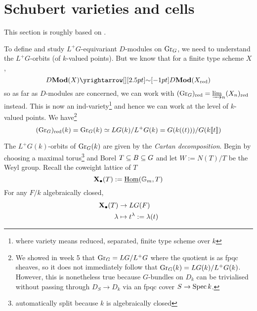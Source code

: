 \documentclass{article}
\begin{document}


\section{Schubert varieties and cells}

This section is roughly based on \cite[Section 2.1]{Zhu-17}.

To define and study $L^+G$-equivariant $D$-modules on $\operatorname{Gr}_G$,
we need to understand the $L^+G$-orbits (of $k$-valued points).
But we know that for a finite type scheme $X$, 
\[
  D\MOD(X) \map{\sim}{} D\MOD(X_\RED)
\]
so as far as $D$-modules are concerned,
we can work with $(\operatorname{Gr}_G)_{\mathrm{red}} = \varinjlim_{n} (X_n)_{\mathrm{red}}$ instead.
This is now an ind-variety\footnote{
  where variety means reduced, separated, finite type scheme over $k$
}
and hence we can work at the level of $k$-valued points.
We have\footnote{
  We showed in week 5 that $\operatorname{Gr}_G = LG / L^+G$ where the quotient
  is as fpqc sheaves, so it does not
  immediately follow that $\operatorname{Gr}_G(k) = LG(k) / L^+G(k)$.
  However, this is nonetheless true because $G$-bundles on $D_k$
  can be trivialised without passing through $D_S \to D_k$ 
  via an fpqc cover $S \to \operatorname{Spec} k$.
}
\[
  (\operatorname{Gr}_G)_{\mathrm{red}}(k) = \operatorname{Gr}_G(k) \simeq LG(k) / L^+G(k) = G(k((t))) / G(k\llbracket t \rrbracket)
\]

The $L^+G(k)$-orbits of $\operatorname{Gr}_G(k)$ are given by the \emph{Cartan decomposition}.
Begin by choosing a maximal torus\footnote{
  automatically split because $k$ is algebraically closed
} and Borel $T \subseteq B \subseteq G$
and let $W := N(T) / T$ be the Weyl group.
Recall the coweight lattice of $T$ \[
  \mathbf{X}_\bullet(T) := \underline{\mathrm{Hom}}(\mathbb{G}_m , T)
\]
For any $F / k$ algebraically closed,
\begin{align*}
  \mathbf{X}_\bullet(T) &\to LG(F) \\
  \lambda &\mapsto t^\lambda := \lambda(t)
\end{align*}
\end{document}
